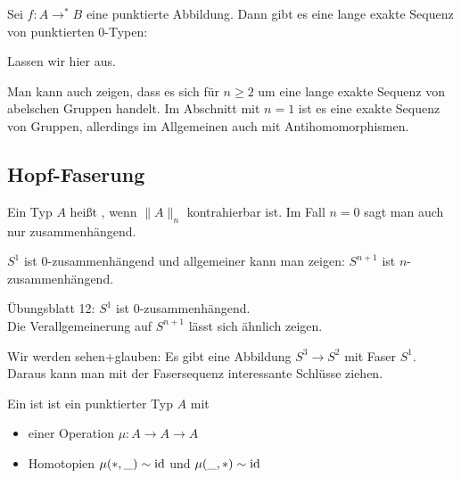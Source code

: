\begin{theorem}
  Sei $f:A\to^{\ast}B$ eine punktierte Abbildung. Dann gibt es eine lange exakte Sequenz von punktierten $0$-Typen:
  \begin{center}
  \end{center}
  
\end{theorem}
\begin{beweis}
  Lassen wir hier aus. 
\end{beweis}
\begin{bemerkung}
  Man kann auch zeigen, dass es sich für $n\geq 2$ um eine lange exakte Sequenz von abelschen Gruppen handelt.
  Im Abschnitt mit $n=1$ ist es eine exakte Sequenz von Gruppen, allerdings im Allgemeinen auch mit Antihomomorphismen.
\end{bemerkung}


\subsection{Hopf-Faserung}

\begin{definition}
  Ein Typ $A$ heißt , wenn $\|A\|_n$ kontrahierbar ist.
  Im Fall $n=0$ sagt man auch nur zusammenhängend.
\end{definition}

\begin{bemerkung}
  \label{bem:Sn-zsh}
  $S^1$ ist $0$-zusammenhängend und allgemeiner kann man zeigen: $S^{n+1}$ ist $n$-zusammenhängend.
\end{bemerkung}
\begin{beweis}
  Übungsblatt 12: $S^1$ ist $0$-zusammenhängend. \\
  Die Verallgemeinerung auf $S^{n+1}$ lässt sich ähnlich zeigen.
\end{beweis}

Wir werden sehen+glauben: Es gibt eine Abbildung $S^3\to S^2$ mit Faser $S^1$.
Daraus kann man mit der Fasersequenz interessante Schlüsse ziehen.

\begin{definition}
  Ein  ist ist ein punktierter Typ $A$ mit
  \begin{itemize}
  \item einer Operation $\mu:A\to A\to A$
  \item Homotopien $\mu(\ast,\_)\sim \mathrm{id}$ und $\mu(\_,\ast)\sim\mathrm{id}$
  \end{itemize}
\end{definition}

